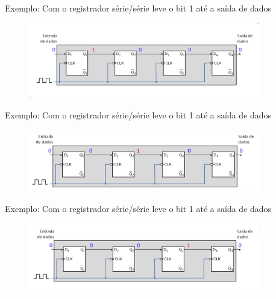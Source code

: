 \documentclass{beamer}
\begin{document}
\begin{frame}{Exemplo: Com o registrador série/série leve o bit 1 até a saída de dados
 }

\begin{figure}
\centering
\includegraphics[width=0.9\textwidth]{figures/seq_2.png}
\end{figure}


\end{frame}

\begin{frame}{Exemplo: Com o registrador série/série leve o bit 1 até a saída de dados
 }

\begin{figure}
\centering
\includegraphics[width=0.9\textwidth]{figures/seq_3.png}
\end{figure}


\end{frame}

\begin{frame}{Exemplo: Com o registrador série/série leve o bit 1 até a saída de dados
 }

\begin{figure}
\centering
\includegraphics[width=0.9\textwidth]{figures/seq_4.png}
\end{figure}


\end{frame}
\end{document}
